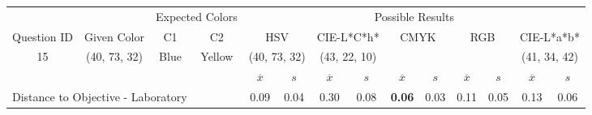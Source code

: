 \begin{table}[H]
  \resizebox{\textwidth}{!} {
  \begin{tabular}{lccccccccccccc}
    \hline
    \multicolumn{1}{c}{}                              &                                      & \multicolumn{2}{c}{Expected Colors}                   & \multicolumn{10}{c}{Possible Results}                                                                                                                                                                                                                                                                                        \\ \cline{3-14}
    \multicolumn{1}{c}{\multirow{-2}{*}{Question ID}} & \multirow{-2}{*}{Given Color}        & C1                       & C2                         & \multicolumn{2}{c}{HSV}                                        & \multicolumn{2}{c}{CIE-L*C*h*}                                 & \multicolumn{2}{c}{CMYK}                                       & \multicolumn{2}{c}{RGB}                                        & \multicolumn{2}{c}{CIE-L*a*b*}                                 \\ \hline
    \multicolumn{1}{c}{15}                             & \cellcolor[HTML]{00FF80}(40, 73, 32) & \multicolumn{1}{c|}{Blue} & \multicolumn{1}{c|}{Yellow}  & \multicolumn{2}{c|}{\cellcolor[HTML]{00FF80}(40, 73, 32)}      & \multicolumn{2}{c|}{\cellcolor[HTML]{FF0050}(43, 22, 10)}       & \multicolumn{2}{c|}{\cellcolor[HTML]{808080}{\color[HTML]{FFFFFF}(21, 22, 24)}}       & \multicolumn{2}{c|}{\cellcolor[HTML]{808080}{\color[HTML]{FFFFFF}(21, 22, 24)}}       & \multicolumn{2}{c|}{\cellcolor[HTML]{CA8AAA}(41, 34, 42)}       \\ \hline
                                                      & \multicolumn{1}{l}{}                 & \multicolumn{1}{l}{}     & \multicolumn{1}{l}{}       & \multicolumn{1}{c}{$\overline{x}$} & \multicolumn{1}{c}{$s$} & \multicolumn{1}{c}{$\overline{x}$} & \multicolumn{1}{c}{$s$} & \multicolumn{1}{c}{$\overline{x}$} & \multicolumn{1}{c}{$s$} & \multicolumn{1}{c}{$\overline{x}$} & \multicolumn{1}{c}{$s$} & \multicolumn{1}{c}{$\overline{x}$} & \multicolumn{1}{c}{$s$} \\ \hline
    \multicolumn{4}{l}{Distance to Objective - Laboratory}                                                                                           & \multicolumn{1}{|c}{0.09}       & \multicolumn{1}{c|}{0.04}    & \multicolumn{1}{|c}{0.30}       & \multicolumn{1}{c|}{0.08}    & \multicolumn{1}{|c}{\textbf{0.06}}       & \multicolumn{1}{c|}{0.03}    & \multicolumn{1}{|c}{0.11}       & \multicolumn{1}{c|}{0.05}    & \multicolumn{1}{|c}{0.13}       & \multicolumn{1}{c|}{0.06}    \\

\end{tabular}}
\end{table}

